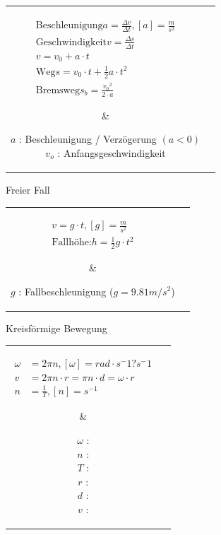 	\begin{tabular}{cc}
	\parbox{2.5cm}{
		\begin{emphbox}
			\begin{align*}
				\text{Beschleunigung} a = \frac{\Delta v}{\Delta t}, [a] = \frac{m}{s^2} \\
				\text{Geschwindigkeit} v = \frac{\Delta s}{\Delta t} \\
				v = v_0 + a \cdot t \\
				\text{Weg} s = v_0 \cdot t + \frac{1}{2} a \cdot t^2 \\
				\text{Bremsweg} s_b = \frac{{v_0}^2}{2 \cdot a}
			\end{align*}
		\end{emphbox}
	} & 
	\parbox{3.5cm}{
		\begin{symbolbox}
			$a$ : Beschleunigung / Verzögerung $(a<0)$ \\
			$v_o$ : Anfangsgeschwindigkeit
		\end{symbolbox}
	}
	\end{tabular}

Freier Fall

\begin{tabular}{cc}
	\parbox{2.5cm}{
		\begin{emphbox}
			\begin{align*}
				v = g \cdot t, [g] = \frac{m}{s^2} \\
				\text{Fallhöhe:} h = \frac{1}{2} g \cdot t^2
			\end{align*}
		\end{emphbox}
	} & 
	\parbox{3.5cm}{
		\begin{symbolbox}
			$g$ : Fallbeschleunigung ($g = 9.81 m/s^2$)
		\end{symbolbox}
	}
\end{tabular}

Kreisförmige Bewegung

\begin{tabular}{cc}
	\parbox{2.5cm}{
		\begin{emphbox}
			\begin{align*}
				\omega &= 2 \pi n, [\omega] = rad \cdot s^-1 ? s^-1 \\
				v &= 2 \pi n \cdot r = \pi n \cdot d = \omega \cdot r \\
				n &= \frac{1}{T}, [n] = s^{-1}
			\end{align*}
		\end{emphbox}
	} & 
	\parbox{3.5cm}{
		\begin{symbolbox}
			$\omega$ :  \\
			$n$ :   \\ 
			$T$ :  \\
			$r$ :  \\
			$d$ :  \\
			$v$ : 
		\end{symbolbox}
	}
\end{tabular}



